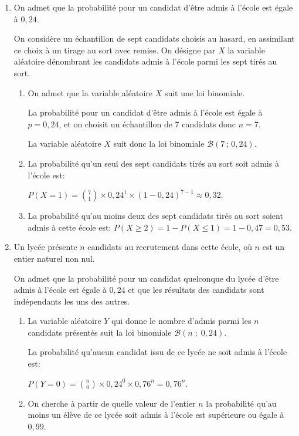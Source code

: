 \documentclass[10pt]{article}
\providecommand{\ds}{\displaystyle}
\begin{document}
\begin{enumerate}
\item On admet que la probabilité pour un candidat d'être admis à l'école est égale à $0,24$.

On considère un échantillon de sept candidats choisis au hasard, en assimilant ce choix à un tirage au sort avec remise. On désigne par $X$ la variable aléatoire dénombrant les candidats admis à l'école parmi les sept tirés au sort.
	\begin{enumerate}
		\item On admet que la variable aléatoire $X$ suit une loi binomiale. 
		
La probabilité pour un candidat d'être admis à l'école est égale à $p=0,24$, et on choisit un échantillon de 7 candidats donc $n=7$.

La variable aléatoire $X$ suit donc la loi binomiale $\mathcal{B}\left (7\,;\,0,24\right )$.
		
		\item La probabilité qu'un seul des sept candidats tirés au sort soit admis à l'école est:
		
$P(X=1)= \ds\binom{7}{1}\times 0,24^1 \times (1-0,24)^{7-1} \approx 0,32$.		
		
		\item La probabilité qu'au moins deux des sept candidats tirés au sort soient admis à cette école est: $P(X\geqslant 2) = 1-P(X\leqslant 1) = 1-0,47=0,53$.		
		
	\end{enumerate}
	
\item  Un lycée présente $n$ candidats au recrutement dans cette école, où $n$ est un entier naturel non nul.

On admet que la probabilité pour un candidat quelconque du lycée d'être admis à l'école est égale à $0,24$ et que les résultats des candidats sont indépendants les uns des autres.

	\begin{enumerate}
		\item La variable aléatoire $Y$ qui donne le nombre d'admis parmi les $n$ candidats présentés suit la loi binomiale $\mathcal{B}\left (n\;;\;0,24\right )$.
		
		 La probabilité qu'aucun candidat issu de ce lycée ne soit admis à l'école est:
		
$P(Y=0) = \ds\binom{n}{0}\times 0,24^0 \times 0,76^n=0,76^n$.		
		
		\item On cherche à partir de quelle valeur de l'entier $n$ la probabilité qu'au moins un élève de ce lycée soit admis à l'école est supérieure ou égale à $0,99$.
		

\end{enumerate}
\end{enumerate}
\end{document}
